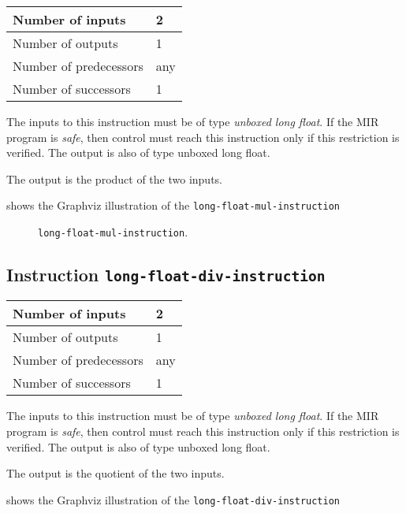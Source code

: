 \begin{tabular}{|l|l|}
\hline
Number of inputs & 2\\
\hline
Number of outputs & 1\\
\hline
Number of predecessors & any\\
\hline
Number of successors & 1\\
\hline
\end{tabular}

The inputs to this instruction must be of type \emph{unboxed long
  float}.  If the MIR program is \emph{safe}, then control must reach
this instruction only if this restriction is verified.  The output is
also of type unboxed long float.

The output is the product of the two inputs.

 shows the Graphviz illustration of the
\texttt{long-float-mul-instruction}

\begin{figure}
\begin{center}
\end{center}
\caption{\label{fig-long-float-mul-instruction}
\texttt{long-float-mul-instruction}.}
\end{figure}

\subsection{Instruction \texttt{long-float-div-instruction}}
\label{mir-instruction-long-float-div}

\begin{tabular}{|l|l|}
\hline
Number of inputs & 2\\
\hline
Number of outputs & 1\\
\hline
Number of predecessors & any\\
\hline
Number of successors & 1\\
\hline
\end{tabular}

The inputs to this instruction must be of type \emph{unboxed long
  float}.  If the MIR program is \emph{safe}, then control must reach
this instruction only if this restriction is verified.  The output is
also of type unboxed long float.

The output is the quotient of the two inputs.

 shows the Graphviz illustration of the
\texttt{long-float-div-instruction}


